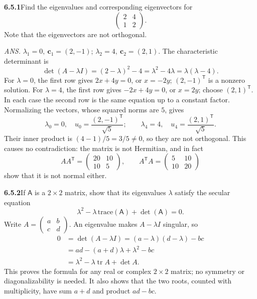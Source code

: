 \par\bigskip
\noindent\textbf{6.5.1}\quad Find the eigenvalues and corresponding
eigenvectors for
\[
\begin{pmatrix}2&4\\1&2\end{pmatrix}.
\]
Note that the eigenvectors are not orthogonal.
\par\nobreak\hfill\emph{ANS.}\enspace
$\lambda_{1}=0,\ \mathbf{c}_{1}=(2,-1)$;\quad
$\lambda_{2}=4,\ \mathbf{c}_{2}=(2,1)$.
\solution
The characteristic determinant is
\[
\det(A-\lambda I)=(2-\lambda)^2-4
=\lambda^2-4\lambda=\lambda(\lambda-4).
\]
For $\lambda=0$, the first row gives $2x+4y=0$, or $x=-2y$;
$(2,-1)^{\mathsf T}$ is a nonzero solution. For $\lambda=4$, the first
row gives $-2x+4y=0$, or $x=2y$; choose $(2,1)^{\mathsf T}$.
In each case the second row is the same equation up to a constant
factor. Normalizing the vectors, whose squared norms are $5$, gives
\[
\boxed{\lambda_0=0,\quad u_0=\frac{(2,-1)^{\mathsf T}}{\sqrt5};
\qquad \lambda_4=4,\quad u_4=\frac{(2,1)^{\mathsf T}}{\sqrt5}.}
\]
Their inner product is $(4-1)/5=3/5\ne0$, so they are not orthogonal.
This causes no contradiction: the matrix is not Hermitian, and in fact
\[
AA^{\mathsf T}=\begin{pmatrix}20&10\\10&5\end{pmatrix},\qquad
A^{\mathsf T}A=\begin{pmatrix}5&10\\10&20\end{pmatrix}
\]
show that it is not normal either.

\par\bigskip
\noindent\textbf{6.5.2}\quad If $\mathsf{A}$ is a $2\times2$ matrix, show that
its eigenvalues $\lambda$ satisfy the secular equation
\[
\lambda^{2}-\lambda\,\mathrm{trace}(\mathsf{A})+\det(\mathsf{A})=0.
\]
\solution
Write $A=\begin{pmatrix}a&b\\c&d\end{pmatrix}$. An eigenvalue
makes $A-\lambda I$ singular, so
\begin{align*}
0&=\det(A-\lambda I)
=(a-\lambda)(d-\lambda)-bc\\
&=ad-(a+d)\lambda+\lambda^2-bc\\
&=\lambda^2-\lambda\operatorname{tr}A+\det A.
\end{align*}
This proves the formula for any real or complex $2\times2$ matrix;
no symmetry or diagonalizability is needed. It also shows that the two
roots, counted with multiplicity, have sum $a+d$ and product $ad-bc$.

